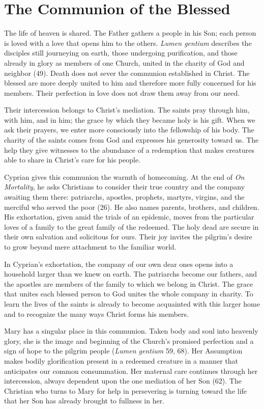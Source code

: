 \section{The Communion of the Blessed}

The life of heaven is shared. The Father gathers a people in his Son; each person is loved with a love that opens him to the others. \emph{Lumen gentium} describes the disciples still journeying on earth, those undergoing purification, and those already in glory as members of one Church, united in the charity of God and neighbor (49). Death does not sever the communion established in Christ. The blessed are more deeply united to him and therefore more fully concerned for his members. Their perfection in love does not draw them away from our need.

Their intercession belongs to Christ's mediation. The saints pray through him, with him, and in him; the grace by which they became holy is his gift. When we ask their prayers, we enter more consciously into the fellowship of his body. The charity of the saints comes from God and expresses his generosity toward us. The help they give witnesses to the abundance of a redemption that makes creatures able to share in Christ's care for his people.

Cyprian gives this communion the warmth of homecoming. At the end of \emph{On Mortality}, he asks Christians to consider their true country and the company awaiting them there: patriarchs, apostles, prophets, martyrs, virgins, and the merciful who served the poor (26). He also names parents, brothers, and children. His exhortation, given amid the trials of an epidemic, moves from the particular loves of a family to the great family of the redeemed. The holy dead are secure in their own salvation and solicitous for ours. Their joy invites the pilgrim's desire to grow beyond mere attachment to the familiar world.

In Cyprian's exhortation, the company of our own dear ones opens into a household larger than we knew on earth. The patriarchs become our fathers, and the apostles are members of the family to which we belong in Christ. The grace that unites each blessed person to God unites the whole company in charity. To learn the lives of the saints is already to become acquainted with this larger home and to recognize the many ways Christ forms his members.

Mary has a singular place in this communion. Taken body and soul into heavenly glory, she is the image and beginning of the Church's promised perfection and a sign of hope to the pilgrim people (\emph{Lumen gentium} 59, 68). Her Assumption makes bodily glorification present in a redeemed creature in a manner that anticipates our common consummation. Her maternal care continues through her intercession, always dependent upon the one mediation of her Son (62). The Christian who turns to Mary for help in persevering is turning toward the life that her Son has already brought to fullness in her.

